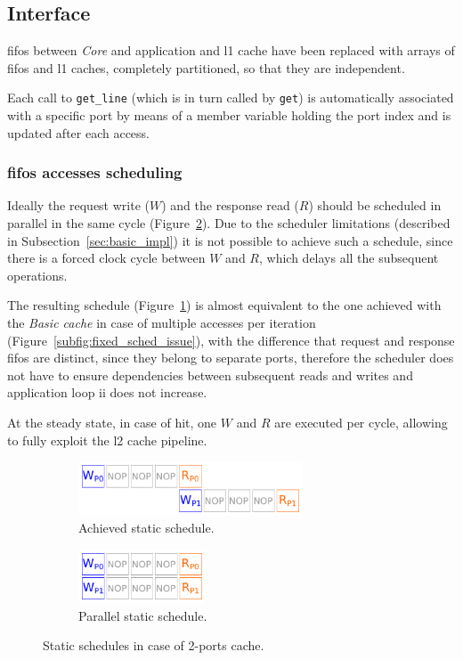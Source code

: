 \documentclass[11pt,a4paper,oneside]{memoir}
\begin{document}
\subsection{Interface}
\acp{fifo} between \emph{Core} and application and \ac{l1} cache have been
replaced with arrays of \acp{fifo} and \ac{l1} caches, completely partitioned,
so that they are independent.

Each call to \texttt{get\_line} (which is in turn called by \texttt{get}) is
automatically associated with a specific port by means of a member variable
holding the port index and is updated after each access.

\subsubsection{\acp{fifo} accesses scheduling}
Ideally the request write ($W$) and the response read ($R$) should be scheduled
in parallel in the same cycle (Figure~\ref{subfig:multiport_des_sched}).
Due to the scheduler limitations (described in
Subsection~\ref{sec:basic_impl}) it is not possible to achieve such a
schedule, since there is a forced clock cycle between $W$ and $R$, which delays
all the subsequent operations.

The resulting schedule (Figure~\ref{subfig:multiport_actual_sched}) is almost
equivalent to the one achieved with the \emph{Basic cache} in case of multiple
accesses per iteration (Figure~\ref{subfig:fixed_sched_issue}), with the
difference that request and response \acp{fifo} are distinct, since they belong
to separate ports, therefore the scheduler does not have to ensure dependencies
between subsequent reads and writes and application loop \ac{ii} does not
increase.

At the steady state, in case of hit, one $W$ and $R$ are executed per cycle,
allowing to fully exploit the \ac{l2} cache pipeline.

\begin{figure}[!htb]
	\centering
	\begin{subfigure}[b]{.4\textwidth}
		\centering
		\includegraphics[height=1.6cm]{multiport_actual_sched}
		\caption{Achieved static schedule.}
		\label{subfig:multiport_actual_sched}
	\end{subfigure}
	\hfill
	\begin{subfigure}[b]{.4\textwidth}
		\centering
		\includegraphics[height=1.6cm]{multiport_des_sched}
		\caption{Parallel static schedule.}
		\label{subfig:multiport_des_sched}
	\end{subfigure}
	\caption{Static schedules in case of 2-ports cache.}
	\label{fig:multiport_sched}
\end{figure}
\end{document}

